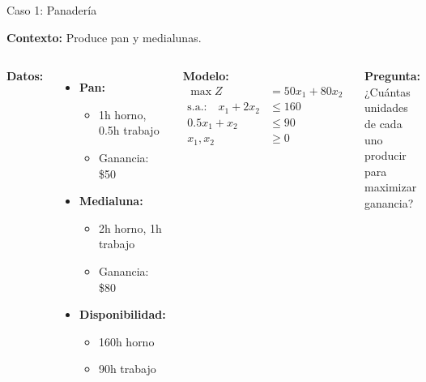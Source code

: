 \documentclass[aspectratio=169,10pt]{beamer}
\begin{document}
\begin{frame}{Caso 1: Panadería}

\textbf{Contexto:} Produce pan y medialunas.

\vspace{0.3cm}

\begin{columns}[T]
\textbf{Datos:}
\begin{itemize}
    \item \textbf{Pan:}
    \begin{itemize}
        \item 1h horno, 0.5h trabajo
        \item Ganancia: \$50
    \end{itemize}
    \item \textbf{Medialuna:}
    \begin{itemize}
        \item 2h horno, 1h trabajo
        \item Ganancia: \$80
    \end{itemize}
    \item \textbf{Disponibilidad:}
    \begin{itemize}
        \item 160h horno
        \item 90h trabajo
    \end{itemize}
\end{itemize}

\textbf{Modelo:}
\begin{align*}
\max Z &= 50x_1 + 80x_2 \\
\text{s.a.:} \quad x_1 + 2x_2 &\leq 160 \\
0.5x_1 + x_2 &\leq 90 \\
x_1, x_2 &\geq 0
\end{align*}

\vspace{0.3cm}

\textbf{Pregunta:}
¿Cuántas unidades de cada uno producir para maximizar ganancia?
\end{columns}

\end{frame}
\end{document}

